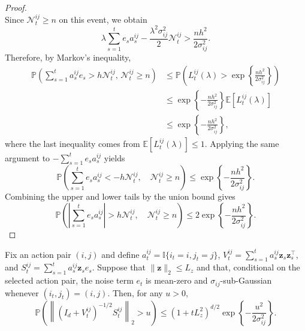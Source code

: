 \documentclass[12pt]{article}
\begin{document}
\begin{proof}
\[\]
Since $\mathcal N_t^{ij}\ge n$ on this event, we obtain
\[
\lambda \sum_{s=1}^t e_s a_s^{ij}
-
\frac{\lambda^2\sigma_{ij}^2}{2}
\mathcal N_t^{ij}
>
\frac{nh^2}{2\sigma_{ij}^2}.
\]
Therefore, by Markov's inequality,
\begin{align*}
\mathbb P \left( \sum_{s=1}^t a_s^{ij} e_s  > h\mathcal N_t^{ij}, \, \mathcal N_t^{ij}\ge n \right)
&\le
\mathbb P\left(
L_t^{ij}(\lambda)
>
\exp\left\{
\frac{nh^2}{2\sigma_{ij}^2}
\right\}
\right)
\\
&\le
\exp\left\{
-\frac{nh^2}{2\sigma_{ij}^2}
\right\}
\mathbb E\left[
L_t^{ij}(\lambda)
\right]
\\
&\le
\exp\left\{
-\frac{nh^2}{2\sigma_{ij}^2}
\right\},
\end{align*}
where the last inequality comes from $\mathbb E\left[ L_t^{ij}(\lambda) \right] \le 1$.
Applying the same argument to $-\sum_{s=1}^t e_s a_s^{ij}$ yields
\[
\mathbb P\left(
\sum_{s=1}^t e_s a_s^{ij}
<
-h\mathcal N_t^{ij},
\quad
\mathcal N_t^{ij}\ge n
\right)
\le
\exp\left\{
-\frac{nh^2}{2\sigma_{ij}^2}
\right\}.
\]
Combining the upper and lower tails by the union bound gives
\[
\mathbb P\left(
\left|
\sum_{s=1}^t e_s a_s^{ij}
\right|
>
h\mathcal N_t^{ij},
\quad
\mathcal N_t^{ij}\ge n
\right)
\le
2
\exp\left\{
-\frac{nh^2}{2\sigma_{ij}^2}
\right\}.
\]
\end{proof}

\begin{lemma}
\label{lem:context-self-normalized}
Fix an action pair $(i,j)$ and define $a_t^{ij} = \mathbb I\{i_t=i,j_t=j\}$, $V_t^{ij} = \sum_{s=1}^t a_s^{ij}\bm z_s\bm z_s^\top$, and $S_t^{ij}= \sum_{s=1}^t a_s^{ij}\bm z_s e_s$.
Suppose that $\|\bm z\|_2\le L_z$ and that, conditional on the selected action pair, the noise term $e_t$ is mean-zero and $\sigma_{ij}$-sub-Gaussian whenever $(i_t,j_t)=(i,j)$.
Then, for any $u>0$,
\[
\mathbb P\left(
\left\|
\left(
I_d+V_t^{ij}
\right)^{-1/2}
S_t^{ij}
\right\|_2
>
u
\right)
\le
\left(
1+tL_z^2
\right)^{d/2}
\exp\left\{
-\frac{u^2}{2\sigma_{ij}^2}
\right\}.
\]
\end{lemma}
\end{document}

